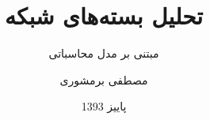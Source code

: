 \documentclass{../boostan/Boostan-Proposal}
\title{تحلیل بسته‌های شبکه}
\subtitle{مبتنی بر مدل محاسباتی  \lr{FTC}}
\institute{پژوهشکده افتا}
\date{پاییز 1393}
\author{مصطفی برمشوری}
\begin{document}
	
	\maketitle
	
	
	
	
	
	
	
	
	\printglossary
\end{document}
